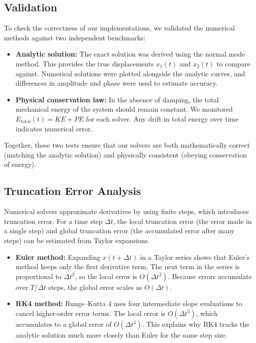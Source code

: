 \documentclass[12pt]{article}
\begin{document}
\subsection{Validation}

To check the correctness of our implementations, we validated the numerical methods against two independent benchmarks:

\begin{itemize}
    \item \textbf{Analytic solution:} The exact solution was derived using the normal mode method. This provides the true displacements $x_1(t)$ and $x_2(t)$ to compare against. Numerical solutions were plotted alongside the analytic curves, and differences in amplitude and phase were used to estimate accuracy.
    \item \textbf{Physical conservation law:} In the absence of damping, the total mechanical energy of the system should remain constant. We monitored $E_{\text{total}}(t) = KE + PE$ for each solver. Any drift in total energy over time indicates numerical error.
\end{itemize}

Together, these two tests ensure that our solvers are both mathematically correct (matching the analytic solution) and physically consistent (obeying conservation of energy).

\subsection{Truncation Error Analysis}

Numerical solvers approximate derivatives by using finite steps, which introduces truncation error. For a time step $\Delta t$, the local truncation error (the error made in a single step) and global truncation error (the accumulated error after many steps) can be estimated from Taylor expansions.

\begin{itemize}
    \item \textbf{Euler method:} Expanding $x(t + \Delta t)$ in a Taylor series shows that Euler's method keeps only the first derivative term. The next term in the series is proportional to $\Delta t^2$, so the local error is $O(\Delta t^2)$. Because errors accumulate over $T/\Delta t$ steps, the global error scales as $O(\Delta t)$.
    \item \textbf{RK4 method:} Runge–Kutta 4 uses four intermediate slope evaluations to cancel higher-order error terms. The local error is $O(\Delta t^5)$, which accumulates to a global error of $O(\Delta t^4)$. This explains why RK4 tracks the analytic solution much more closely than Euler for the same step size.
\end{itemize}
\end{document}
